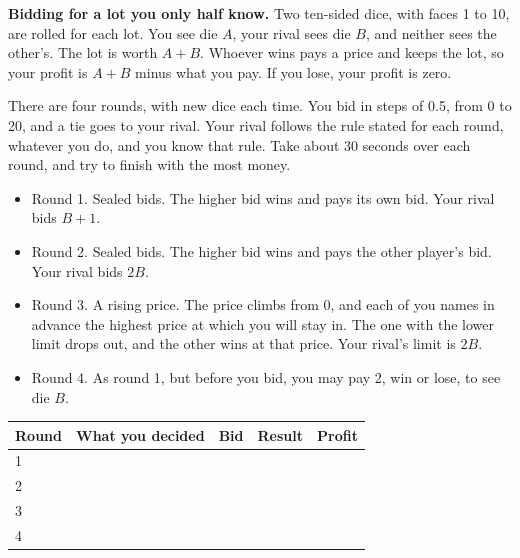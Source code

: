 \begin{question}\label{iq:iv2:played-games:3}
\textbf{Bidding for a lot you only half know.} Two ten-sided dice, with faces 1 to 10, are rolled for each lot. You see die $A$, your rival sees die $B$, and neither sees the other's. The lot is worth $A + B$. Whoever wins pays a price and keeps the lot, so your profit is $A + B$ minus what you pay. If you lose, your profit is zero.

There are four rounds, with new dice each time. You bid in steps of 0.5, from 0 to 20, and a tie goes to your rival. Your rival follows the rule stated for each round, whatever you do, and you know that rule. Take about 30 seconds over each round, and try to finish with the most money.
\begin{itemize}
\item Round 1. Sealed bids. The higher bid wins and pays its own bid. Your rival bids $B + 1$.
\item Round 2. Sealed bids. The higher bid wins and pays the other player's bid. Your rival bids $2B$.
\item Round 3. A rising price. The price climbs from 0, and each of you names in advance the highest price at which you will stay in. The one with the lower limit drops out, and the other wins at that price. Your rival's limit is $2B$.
\item Round 4. As round 1, but before you bid, you may pay 2, win or lose, to see die $B$.
\end{itemize}

\medskip
\begin{tabular}{@{}l|p{5.5cm}|l|l|l@{}}
Round & What you decided & Bid & Result & Profit \\ \hline
1 & & & & \\[8pt]\hline
2 & & & & \\[8pt]\hline
3 & & & & \\[8pt]\hline
4 & & & & \\[8pt]\hline
\end{tabular}
\end{question}
\vfill\clearpage

